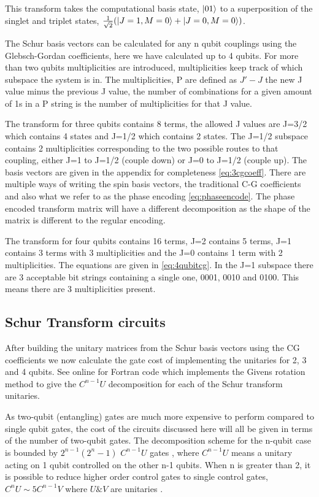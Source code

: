 \documentclass[12pt]{article}
\begin{document}
This transform takes the computational basis state, $\left\vert{01}\right\rangle$ to a superposition of the singlet and triplet states, $\frac{1}{\sqrt{2}} (\left\vert{J=1, M=0}\right\rangle + \left\vert{J=0, M=0}\right\rangle)$. 

The Schur basis vectors can be calculated for any n qubit couplings using the Glebsch-Gordan coefficients, here we have calculated up to 4 qubits. For more than two qubits multiplicities are introduced, multiplicities keep track of which subspace the system is in. The multiplicities, P are defined as $J'-J$ the new J value minus the previous J value, the number of combinations for a given amount of 1s in a P string is the number of multiplicities for that J value.

The transform for three qubits contains 8 terms, the allowed J values are J=3/2 which contains 4 states and J=1/2 which contains 2 states. The J=1/2 subspace contains 2 multiplicities corresponding to the two possible routes to that coupling, either J=1 to J=1/2 (couple down) or J=0 to J=1/2 (couple up). The basis vectors are given in the appendix for completeness \autoref{eq:3cgcoeff}. There are multiple ways of writing the spin basis vectors, the traditional C-G coefficients and also what we refer to as the phase encoding \autoref{eq:phaseencode}. The phase encoded transform matrix will have a different decomposition as the shape of the matrix is different to the regular encoding. 

The transform for four qubits contains 16 terms, J=2 contains 5 terms, J=1 contains 3 terms with 3 multiplicities and the J=0 contains 1 term with 2 multiplicities. The equations are given in \autoref{eq:4qubitcg}. In the J=1 subspace there are 3 acceptable bit strings containing a single one, 0001, 0010 and 0100. This means there are 3 multiplicities present. 

\subsection{Schur Transform circuits}

After building the unitary matrices from the Schur basis vectors using the CG coefficients we now calculate the gate cost of implementing the unitaries for 2, 3 and 4 qubits. See online \cite{githubot561} for Fortran code which implements the Givens rotation method to give the $C^{n-1}U$ decomposition for each of the Schur transform unitaries. 

As two-qubit (entangling) gates are much more expensive to perform compared to single qubit gates, the cost of the circuits discussed here will all be given in terms of the number of two-qubit gates. The decomposition scheme for the n-qubit case is bounded by $2^{n-1}(2^n-1)$ $C^{n-1}U$ gates \cite{li2013decomposition}, where $C^{n-1}U$ means a unitary acting on 1 qubit controlled on the other n-1 qubits. When n is greater than 2, it is possible to reduce higher order control gates to single control gates, $C^nU \sim 5 C^{n-1}V$ where $U \& V$ are unitaries \cite{barenco1995elementary}.
\end{document}
